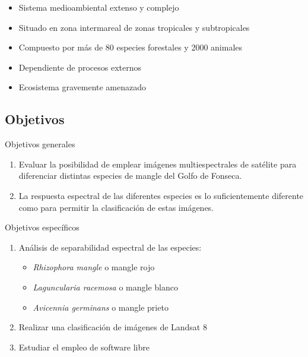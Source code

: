 \documentclass[12pt]{beamer}
\begin{document}
\begin{frame}
\begin{block}{}
	\begin{itemize}
		\item Sistema medioambiental extenso y complejo \pause
		\item Situado en zona intermareal de zonas tropicales y subtropicales \pause
		\item Compuesto por más de 80 especies forestales y 2000 animales \pause
		\item Dependiente de procesos externos \pause
		\item Ecosistema gravemente amenazado
	\end{itemize}
\end{block}
\end{frame}

\subsection{Objetivos}
\begin{frame}
\begin{block}{Objetivos generales}
	\begin{enumerate}[<+->]
		\item Evaluar la posibilidad de emplear imágenes multiespectrales de satélite para diferenciar distintas especies de mangle del Golfo de Fonseca.
		\item La respuesta espectral de las diferentes especies es lo suficientemente diferente como para permitir la clasificación de estas imágenes.
	\end{enumerate}
\end{block}
\end{frame}

\begin{frame}
	\begin{block}{Objetivos específicos}
		\begin{enumerate}
			\item<1-> Análisis de separabilidad espectral de las especies:
				\begin{itemize}
					\item \textit{Rhizophora mangle} o mangle rojo
					\item \textit{Laguncularia racemosa} o mangle blanco
					\item \textit{Avicennia germinans} o mangle prieto
				\end{itemize}
			\item<2-> Realizar una clasificación de imágenes de Landsat 8\\
			\item<3-> Estudiar el empleo de software libre
		\end{enumerate}
	\end{block}
\end{frame}
\end{document}
